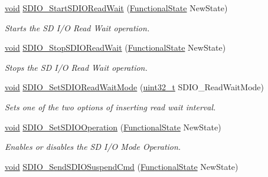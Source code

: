 \begin{DoxyCompactItemize}
\hyperlink{usb__devapi_8h_afabf60e7f57651d6d595a02c75f07cd0}{void} \hyperlink{group___s_d_i_o___private___functions_gac88f914d9a68a83abc2265ec8a7b79fc}{S\+D\+I\+O\+\_\+\+Start\+S\+D\+I\+O\+Read\+Wait} (\hyperlink{agilefox_2library_2inc_2stm32f10x__type_8h_ac9a7e9a35d2513ec15c3b537aaa4fba1}{Functional\+State} New\+State)
\begin{DoxyCompactList}\small\item\em Starts the SD I/O Read Wait operation. \end{DoxyCompactList}\item 
\hyperlink{usb__devapi_8h_afabf60e7f57651d6d595a02c75f07cd0}{void} \hyperlink{group___s_d_i_o___private___functions_gaca6b25eb2debb73ac827c66f0ebcf837}{S\+D\+I\+O\+\_\+\+Stop\+S\+D\+I\+O\+Read\+Wait} (\hyperlink{agilefox_2library_2inc_2stm32f10x__type_8h_ac9a7e9a35d2513ec15c3b537aaa4fba1}{Functional\+State} New\+State)
\begin{DoxyCompactList}\small\item\em Stops the SD I/O Read Wait operation. \end{DoxyCompactList}\item 
\hyperlink{usb__devapi_8h_afabf60e7f57651d6d595a02c75f07cd0}{void} \hyperlink{group___s_d_i_o___private___functions_ga2baac4ea1bb6c2d94345d2712604338a}{S\+D\+I\+O\+\_\+\+Set\+S\+D\+I\+O\+Read\+Wait\+Mode} (\hyperlink{_p_e___types_8h_a33594304e786b158f3fb30289278f5af}{uint32\+\_\+t} S\+D\+I\+O\+\_\+\+Read\+Wait\+Mode)
\begin{DoxyCompactList}\small\item\em Sets one of the two options of inserting read wait interval. \end{DoxyCompactList}\item 
\hyperlink{usb__devapi_8h_afabf60e7f57651d6d595a02c75f07cd0}{void} \hyperlink{group___s_d_i_o___private___functions_ga24e210c185d5a7855cbaff4472a8f8d1}{S\+D\+I\+O\+\_\+\+Set\+S\+D\+I\+O\+Operation} (\hyperlink{agilefox_2library_2inc_2stm32f10x__type_8h_ac9a7e9a35d2513ec15c3b537aaa4fba1}{Functional\+State} New\+State)
\begin{DoxyCompactList}\small\item\em Enables or disables the SD I/O Mode Operation. \end{DoxyCompactList}\item 
\hyperlink{usb__devapi_8h_afabf60e7f57651d6d595a02c75f07cd0}{void} \hyperlink{group___s_d_i_o___private___functions_ga9264137a01a1ab81d03bc80a3b3120fc}{S\+D\+I\+O\+\_\+\+Send\+S\+D\+I\+O\+Suspend\+Cmd} (\hyperlink{agilefox_2library_2inc_2stm32f10x__type_8h_ac9a7e9a35d2513ec15c3b537aaa4fba1}{Functional\+State} New\+State)

\end{DoxyCompactItemize}
